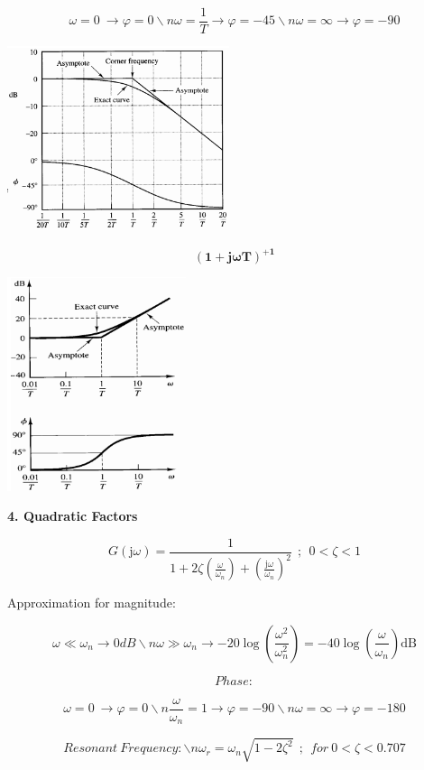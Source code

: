 \documentclass[a0,landscape]{article}
\begin{document}
\begin{multicols}{3}
\[{\omega = 0\  \rightarrow \varphi = 0\backslash n}{\omega = \frac{1}{T} \rightarrow \varphi = - 45\backslash n}{\omega = \infty \rightarrow \varphi = - 90}\]

\includegraphics[width=2.55816in,height=2.13600in]{media/image22.png}

\[\left( \mathbf{1 + j\omega T} \right)^{\mathbf{+ 1}}\]

\includegraphics[width=2.05792in,height=2.46400in]{media/image23.png}

\textbf{4. Quadratic Factors}

\[G\left( \text{j}\omega \right) = \frac{1}{1 + 2\zeta\left( \frac{\omega}{\omega_{n}} \right) + \left( \frac{\text{j}\omega}{\omega_{n}} \right)^{2}}\ \ ;\ \ 0 < \zeta < 1\]

Approximation for magnitude:

\[{\omega \ll \omega_{n} \rightarrow 0dB\backslash n}{\omega \gg \omega_{n} \rightarrow - 20\log\left( \frac{\omega^{2}}{\omega_{n}^{2}} \right) = - 40\log{\left( \frac{\omega}{\omega_{n}} \right)\text{dB}}}\]

\[Phase:\]

\[{\omega = 0\  \rightarrow \varphi = 0\backslash n}{\frac{\omega}{\omega_{n}} = 1 \rightarrow \varphi = - 90\backslash n}{\omega = \infty \rightarrow \varphi = - 180}\]

\[{Resonant\ Frequency:\backslash n}{\omega_{r} = \omega_{n}\sqrt{1 - 2\zeta^{2}}\ \ ;\ \ for\ 0 < \zeta < 0.707}\]


\end{multicols}
\end{document}
